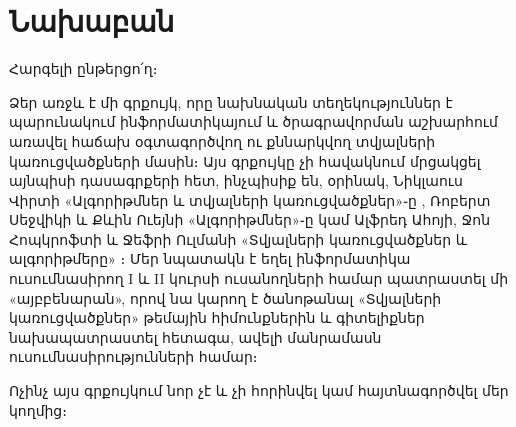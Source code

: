 \chapter*{Նախաբան}

Հարգելի ընթերցո՛ղ։

Ձեր առջև է մի գրքույկ, որը նախնական տեղեկություններ է պարունակում
ինֆորմատիկայում և ծրագրավորման աշխարհում առավել հաճախ օգտագործվող ու
քննարկվող տվյալների կառուցվածքների մասին։ Այս գրքույկը չի հավակնում
մրցակցել այնպիսի դասագրքերի հետ, ինչպիսիք են, օրինակ, Նիկլաուս Վիրտի
«Ալգորիթմներ և տվյալների կառուցվածքներ»֊ը \cite{nw-ads}, Ռոբերտ Սեջվիկի
և Քևին Ուեյնի «Ալգորիթմներ»֊ը \cite{rs-kw-al} կամ Ալֆրեդ Ահոյի, Ջոն
Հոպկրոֆտի և Ջեֆրի Ուլմանի «Տվյալների կառուցվածքներ և ալգորիթմերը»
\cite{ahu-dsa}։ Մեր նպատակն է եղել ինֆորմատիկա ուսումնասիրող I և II
կուրսի ուսանողների համար պատրաստել մի «այբբենարան», որով նա կարող է
ծանոթանալ «Տվյալների կառուցվածքներ» թեմային հիմունքներին և գիտելիքներ
նախապատրաստել հետագա, ավելի մանրամասն ուսումնասիրությունների համար։

Ոչինչ այս գրքույկում նոր չէ և չի հորինվել կամ հայտնագործվել մեր կողմից։
